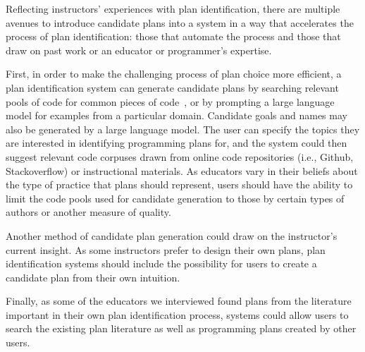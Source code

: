 Reflecting instructors' experiences with plan identification, there are multiple avenues to introduce candidate plans into a system in a way that accelerates the process of plan identification: those that automate the process and those that draw on past work or an educator or programmer's expertise. 


First, in order to make the challenging process of plan choice more efficient, a plan identification system can generate candidate plans by searching relevant pools of code for common pieces of code~\cite{haggis_code_similarity}, or by prompting a large language model for examples from a particular domain. Candidate goals and names may also be generated by a large language model. The user can specify the topics they are interested in identifying programming plans for, and the system could then suggest relevant code corpuses drawn from online code repositories (i.e., Github, Stackoverflow) or instructional materials. As educators vary in their beliefs about the type of practice that plans should represent, users should have the ability to limit the code pools used for candidate generation to those by certain types of authors or another measure of quality.


Another method of candidate plan generation could draw on the instructor's current insight. As some instructors prefer to design their own plans, plan identification systems should include the possibility for users to create a candidate plan from their own intuition. %

Finally, as some of the educators we interviewed found plans from the literature important in their own plan identification process, systems could allow users to search the existing plan literature as well as programming plans created by other users.

\subsection{} %


